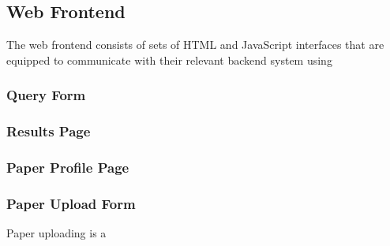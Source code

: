 \subsection{ Web Frontend }

The web frontend consists of sets of HTML and JavaScript interfaces that are
equipped to communicate with their relevant backend system using

\subsubsection{ Query Form }

\subsubsection{ Results Page }

\subsubsection{ Paper Profile Page }

\subsubsection{Paper Upload Form}
Paper uploading is a 
